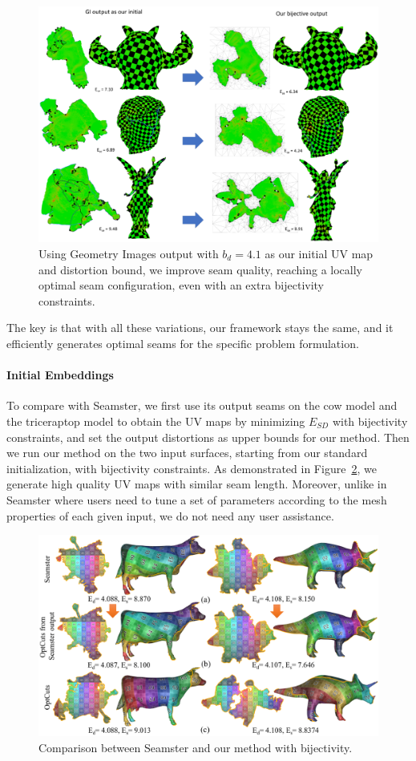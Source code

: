 \begin{figure}[!h]
\centering
\includegraphics[width=\linewidth]{fig/comp_GI_outputAsInit.png}
\caption{Using Geometry Images output with $b_d = 4.1$ as our initial UV map and distortion bound, we improve seam quality, reaching a locally optimal seam configuration, even with an extra bijectivity constraints.}
\label{fig:comp_GI_outputAsInit}
\end{figure}

The key is that with all these variations, our framework stays the same, and it efficiently generates optimal seams for the specific problem formulation.

\paragraph{Initial Embeddings}
To compare with Seamster, we first use its output seams on the cow model and the triceraptop model to obtain the UV maps by minimizing $E_{SD}$ with bijectivity constraints, and set the output distortions as upper bounds for our method. Then we run our method on the two input surfaces, starting from our standard initialization, with bijectivity constraints. As demonstrated in Figure~\ref{fig:comp_Seamster}, we generate high quality UV maps with similar seam length. Moreover, unlike in Seamster where users need to tune a set of parameters according to the mesh properties of each given input, we do not need any user assistance.  

\begin{figure}[!h]
\centering
\includegraphics[width=\linewidth]{fig/comp_Seamster.png}
\caption{Comparison between Seamster and our method with bijectivity.}
\label{fig:comp_Seamster}
\end{figure}
